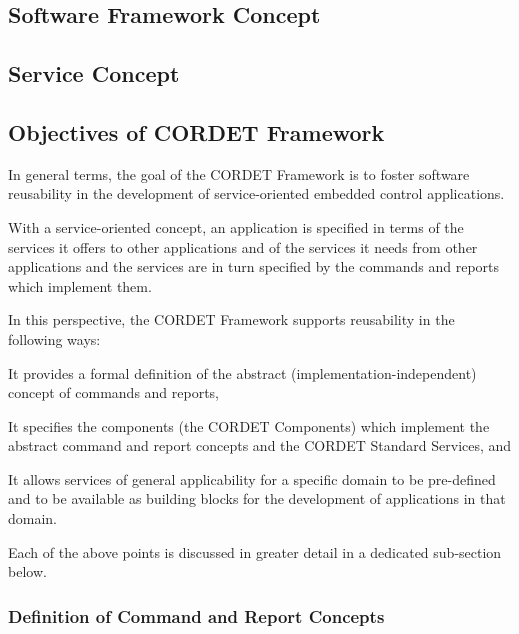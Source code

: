 \documentclass[a4paper,10pt]{article}
\newenvironment{fw_enumerate}					%
{\begin{enumerate}
  \setlength{\itemsep}{1mm}
  \setlength{\parskip}{0pt}
  \setlength{\parsep}{0pt}}
{\end{enumerate}}
\begin{document}
\subsection{Software Framework Concept}\label{sec:SwFwConcept} 


\subsection{Service Concept}\label{sec:ServConcept} 

\subsection{Objectives of CORDET Framework}\label{sec:ObjectivesOfCrFw} 

In general terms, the goal of the CORDET Framework is to foster software reusability in the development of service-oriented embedded control applications. 

With a service-oriented concept, an application is specified in terms of the services it offers to other applications and of the services it needs from other applications and the services are in turn specified by the commands and reports which implement them.

In this perspective, the CORDET Framework supports reusability in the following ways:

\begin{fw_enumerate}
\item{} It provides a formal definition of the abstract (implementation-independent) concept of commands and reports,
\item{} It specifies the components (the CORDET Components) which implement the abstract command and report concepts and the CORDET Standard Services, and
\item{} It allows services of general applicability for a specific domain to be pre-defined and to be available as building blocks for the development of applications in that domain.
\end{fw_enumerate}

Each of the above points is discussed in greater detail in a dedicated sub-section below. 

\subsubsection{Definition of Command and Report Concepts}\label{sec:DefCmdRepConcepts}
\end{document}
